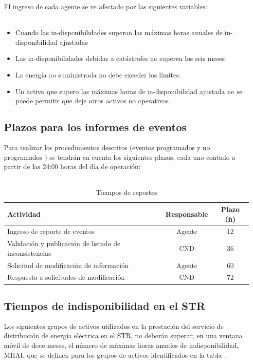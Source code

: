 \documentclass[a5paper]{book}%
\begin{document}
El ingreso de cada agente se ve afectado por las siguientes variables:\\\\

\begin{itemize}
\item Cuando las in-disponibilidades superan las máximas horas anuales de in-disponibilidad ajustadas
\item Las in-disponibilidades debidas a catástrofes no superen los seis meses
\item La energía no suministrada no debe exceder los límites.
\item Un activo que supero las máximas horas de in-disponibilidad ajustada no se puede permitir que deje otros activos no operativos
\end{itemize}

\subsection{Plazos para los informes de eventos}
Para realizar los procedimientos descritos (eventos programados y no programados ) se tendrán en cuenta los siguientes plazos, cada uno contado a partir de las 24:00 horas del día de operación:\\\\


\begin{table}[H]
  \centering
  \caption{Tiempos de reportes}
\begin{tabular}{|p{4cm}|c|c|}
  \hline
Actividad & Responsable&Plazo (h)\\\hline
Ingreso de reporte de eventos &Agente&12\\\hline
Validación y publicación de listado de inconsistencias&
CND&
36\\\hline
Solicitud de modificación de información&
Agente&
60\\\hline
Respuesta a solicitudes de modificación&
CND&
72\\\hline
\end{tabular}
\end{table}

\subsection{Tiempos de indisponibilidad en el STR}

  Los siguientes grupos de activos utilizados en la prestación del servicio de distribución de energía eléctrica en el STR, no deberán superar, en una ventana móvil de doce meses, el número de máximas horas anuales de indisponibilidad, MHAI, que se definen para los grupos de activos identificados en la tabla \cite{CREG0152018}.\\\\
\end{document}
